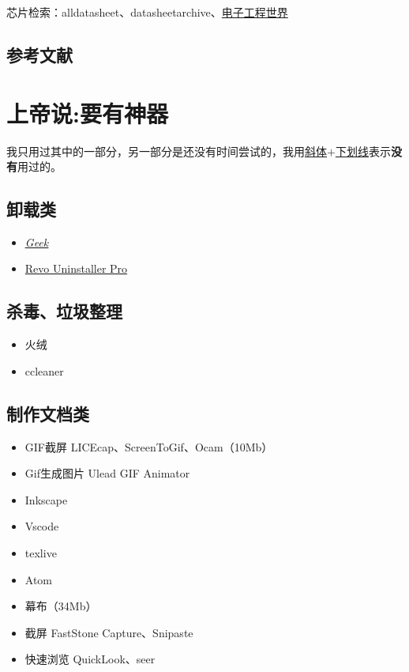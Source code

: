 \documentclass[UTF8,oneside]{ctexbook}
\begin{document}
芯片检索：alldatasheet、datasheetarchive、\href{http:\\datasheet.eeworld.com.cn}{电子工程世界}


\section{参考文献}


\chapter{上帝说:要有神器}
我只用过其中的一部分，另一部分是还没有时间尝试的，我用\underline{斜体$+$下划线}表示\textbf{没有}用过的。
\section{卸载类}
\begin{itemize}
	\item \underline{\textit{\href{https://geekuninstaller.com/download}{Geek}}}
	\item \href{http://www.xue51.com/soft/11977.html}{Revo Uninstaller Pro}
\end{itemize}

\section{杀毒、垃圾整理}
\begin{itemize}
	\item 火绒
	\item ccleaner
\end{itemize}

\section{制作文档类}
\begin{itemize}
	\item GIF截屏 LICEcap、ScreenToGif、Ocam（10Mb）
	\item Gif生成图片 Ulead GIF Animator
	\item Inkscape
	\item Vscode
	\item texlive
	\item Atom
	\item 幕布（34Mb）
	\item 截屏 FastStone Capture、Snipaste
	\item 快速浏览 QuickLook、seer
\end{itemize}
\end{document}
